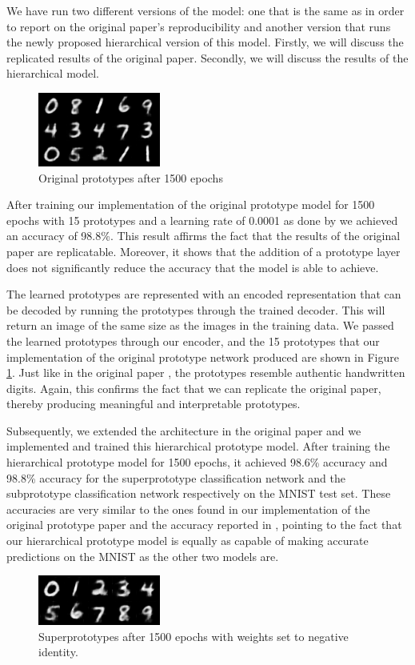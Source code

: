We have run two different versions of the model: one that is the same as \cite{li2018deep} in order to report on the original paper's reproducibility and another version that runs the newly proposed hierarchical version of this model. Firstly, we will discuss the replicated results of the original paper. Secondly, we will discuss the results of the hierarchical model.

\begin{figure}
    \centering
    \includegraphics{img/normalprot1499.png}
    \caption{Original prototypes after 1500 epochs}
    \label{normalprots}
\end{figure}

After training our implementation of the original prototype model for 1500 epochs with 15 prototypes and a learning rate of 0.0001 as done by \cite{li2018deep} we achieved an accuracy of 98.8\%. This result affirms the fact that the results of the original paper are replicatable. Moreover, it shows that the addition of a prototype layer does not significantly reduce the accuracy that the model is able to achieve. 

The learned prototypes are represented with an encoded representation that can be decoded by running the prototypes through the trained decoder. This will return an image of the same size as the images in the training data. We passed the learned prototypes through our encoder, and the 15 prototypes that our implementation of the original prototype network produced are shown in Figure \ref{normalprots}. Just like in the original paper \cite{li2018deep}, the prototypes resemble authentic handwritten digits. Again, this confirms the fact that we can replicate the original paper, thereby producing meaningful and interpretable prototypes.

Subsequently, we extended the architecture in the original paper \cite{li2018deep} and we implemented and trained this hierarchical prototype model. After training the hierarchical prototype model for 1500 epochs, it achieved 98.6\% accuracy and 98.8\% accuracy for the superprototype classification network and the subprototype classification network respectively on the MNIST test set. These accuracies are very similar to the ones found in our implementation of the original prototype paper and the accuracy reported in \cite{li2018deep}, pointing to the fact that our hierarchical prototype model is equally as capable of making accurate predictions on the MNIST as the other two models are. 
\begin{figure}[ht]
    \centering
    \includegraphics{img/prot1499.png}
    \caption{Superprototypes after 1500 epochs with weights set to negative identity.}
    \label{superprots}
\end{figure}

